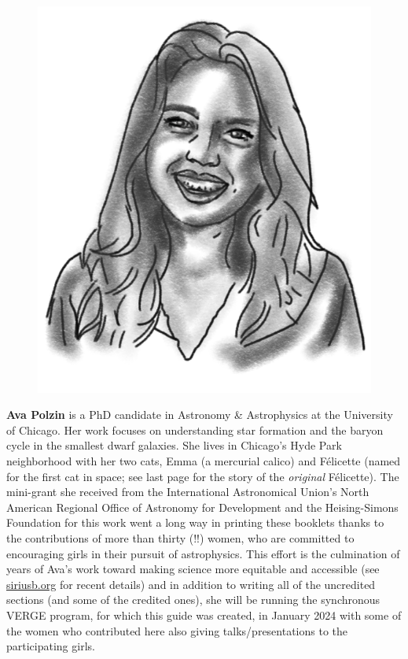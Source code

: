 \begin{figure}
\includegraphics[width=0.9\linewidth]{portraits/ava_again.png}
\end{figure}
\textbf{Ava Polzin} is a PhD candidate in Astronomy \& Astrophysics at the University of Chicago. Her work focuses on understanding star formation and the baryon cycle in the smallest dwarf galaxies. She lives in Chicago's Hyde Park neighborhood with her two cats, Emma (a mercurial calico) and F\'{e}licette (named for the first cat in space; see last page for the story of the \textit{original} F\'{e}licette). The mini-grant she received from the International Astronomical Union's North American Regional Office of Astronomy for Development and the Heising-Simons Foundation for this work went a long way in printing these booklets thanks to the contributions of more than thirty (!!) women, who are committed to encouraging girls in their pursuit of astrophysics. This effort is the culmination of years of Ava's work toward making science more equitable and accessible (see \href{https://siriusb.org}{siriusb.org} for recent details) and in addition to writing all of the uncredited sections (and some of the credited ones), she will be running the synchronous VERGE program, for which this guide was created, in January 2024 with some of the women who contributed here also giving talks/presentations to the participating girls.

